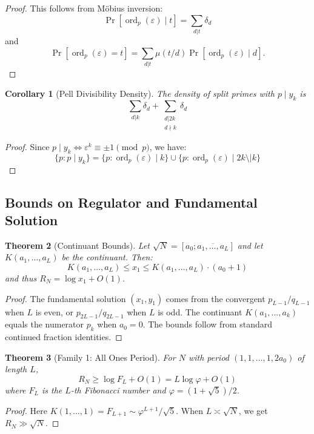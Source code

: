 \documentclass[12pt]{article}
\newtheorem{theorem}{Theorem}
\newtheorem{corollary}[theorem]{Corollary}
\begin{document}
\begin{proof}
This follows from Möbius inversion:
\[
\Pr[\operatorname{ord}_p(\varepsilon) \mid t] = \sum_{d|t} \delta_d
\]
and
\[
\Pr[\operatorname{ord}_p(\varepsilon) = t] = \sum_{d|t} \mu(t/d) \Pr[\operatorname{ord}_p(\varepsilon) \mid d].
\]
\end{proof}

\begin{corollary}[Pell Divisibility Density]
The density of split primes with $p \mid y_k$ is
\[
\sum_{d|k} \delta_d + \sum_{\substack{d|2k \\ d\nmid k}} \delta_d
\]
\end{corollary}

\begin{proof}
Since $p \mid y_k \iff \varepsilon^k \equiv \pm 1 \pmod{p}$, we have:
\[
\{p : p \mid y_k\} = \{p : \operatorname{ord}_p(\varepsilon) \mid k\} \cup \{p : \operatorname{ord}_p(\varepsilon) \mid 2k \setminus \mid k\}
\]
\end{proof}

\subsection{Bounds on Regulator and Fundamental Solution}

\begin{theorem}[Continuant Bounds]
Let $\sqrt{N} = [a_0; \overline{a_1,\dots,a_L}]$ and let $K(a_1,\dots,a_L)$ be the continuant. Then:
\[
K(a_1,\dots,a_L) \leq x_1 \leq K(a_1,\dots,a_L) \cdot (a_0+1)
\]
and thus $R_N = \log x_1 + O(1)$.
\end{theorem}

\begin{proof}
The fundamental solution $(x_1,y_1)$ comes from the convergent $p_{L-1}/q_{L-1}$ when $L$ is even, or $p_{2L-1}/q_{2L-1}$ when $L$ is odd. The continuant $K(a_1,\dots,a_k)$ equals the numerator $p_k$ when $a_0=0$. The bounds follow from standard continued fraction identities.
\end{proof}

\begin{theorem}[Family 1: All Ones Period]
For $N$ with period $(1,1,\dots,1,2a_0)$ of length $L$,
\[
R_N \geq \log F_L + O(1) = L\log\varphi + O(1)
\]
where $F_L$ is the $L$-th Fibonacci number and $\varphi = (1+\sqrt{5})/2$.
\end{theorem}

\begin{proof}
Here $K(1,\dots,1) = F_{L+1} \sim \varphi^{L+1}/\sqrt{5}$. When $L \asymp \sqrt{N}$, we get $R_N \gg \sqrt{N}$.
\end{proof}
\end{document}
